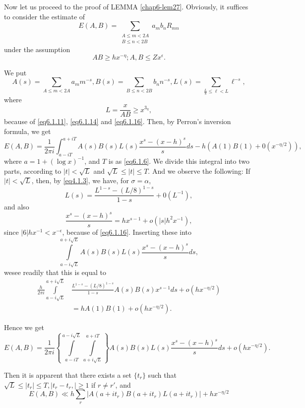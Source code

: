 Now let us proceed to the proof of  LEMMA
\ref{chap6-lem27}. Obviously, it suffices to consider the estimate of  
$$
E (A, B)= \sum_{\substack{A \leq m < 2A\\ B \leq n < 2B}}  a_m b_n R_{mn}
$$
under the assumption
\begin{equation*}
  AB \geq hx^{-\eta}; A, B \leq Zx^ \epsilon.  \tag{6.1.16}\label{eq6.1.16}
\end{equation*}\pageoriginale

We put
$$
A(s) = \sum_{A \leq m < 2A} a_m m^{-s}, B(s) = \sum_{B \leq n < 2B} b_n
n ^{-s}, L(s) = \sum_{\frac{L}{8}\leq \ell < L} \ell^{-s},
$$
where
\begin{equation*}
L = \frac{x}{AB} \geq x ^{3 _{\eta}}, \tag{6.1.17}\label{eq6.1.17}
\end{equation*}
because of \eqref{eq6.1.11}, \eqref{eq6.1.14} and
\eqref{eq6.1.16}. Then, by Perron's inversion formula, we get  
{\fontsize{10pt}{12pt}\selectfont
$$
 E(A, B)= \frac{1}{2 \pi i} \int_{a - i T}^{a + i T} A(s) B(s) L (s)
 \frac{x^s - ( x- h ) ^ s}{s} ds - h(A(1)B(1) + 0 (x^{- \eta /2})), 
$$}\relax
where $a = 1 + (\log x) ^{-1}$, and $T$ is as \eqref{eq6.1.6}. We divide this
integral into two	 parts, according to $| t | < \sqrt{L}$ and $
\sqrt{L} \leq | t | \leq T$. And we observe the following: If $| t | <
\sqrt{L}$, then, by \eqref{eq4.1.3}, we  have, for $\sigma = \alpha$, 
$$
L(s) = \frac{L^{1-s} - ( L / 8 ) ^{1-s}}{1-s} + 0(L^{-1}),
$$
and also 
$$
 \frac{x^s-(x-h)^s}{s} = hx^{s-1}+ o(|s| h^2 x^{-1}),
$$
since $| 6 | hx^{-1} < x^{-\epsilon }$, because of
\eqref{eq6.1.16}. Inserting these into  
$$
\int\limits_{a-i \sqrt{L}}^{a+i \sqrt{L}} A(s) B(s)L(s) \frac{x^s -(x-h)^s}{s}ds,
$$
we\pageoriginale see readily that this is equal to 
\begin{align*}
\frac{h}{2 \pi i} \int\limits_{a-i \sqrt{L}}^{a+i \sqrt{L}}
& \frac{L^{1-s}- (L/8)^{1-s}}{1-s} A(s)B(s) x^{s-1} ds + o (hx ^{-\eta
  /2})\\  
& = hA(1)B(1) + o(hx^{-\eta /2}). 
\end{align*}

Hence we get
$$
E(A, B) = \frac{1}{2 \pi i} \left\{ \int\limits_{ a - i T}^{a - i
  \sqrt{L}} \int\limits_{a+i \sqrt{L}} ^{ a+ i T} \right\} A(s)B(s)L(s)
\frac{x^s - (x-h)^s}{ s} ds + o(hx ^{- \eta /2}). 
$$

Then it is apparent that there exists a set $\{ t_r \}$ such that $
\sqrt{L} \leq | t_r | \leq T, | t_r - t_r,  | \geq 1$ if $r \neq r'$,
and  
$$
E(A,B) \ll h \sum _{r} |A(a+it_r) B(a+it_r) L(a+it_r)|+ hx^{-\eta /2}
$$

